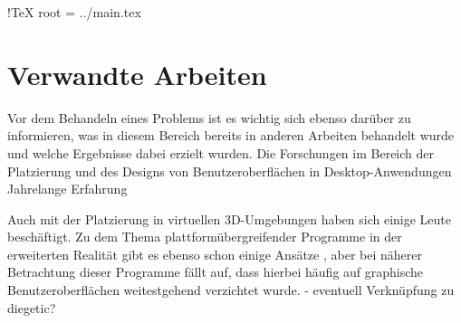  !TeX root = ../main.tex

\chapter{Verwandte Arbeiten}\label{chapter:background}
	

	
		
		
		
		
		
	Vor dem Behandeln eines Problems ist es wichtig sich ebenso darüber zu informieren, was in diesem Bereich bereits in anderen Arbeiten behandelt wurde und welche Ergebnisse dabei erzielt wurden.
	Die Forschungen im Bereich der Platzierung und des Designs von Benutzeroberflächen in Desktop-Anwendungen  Jahrelange Erfahrung
	
	
	Auch mit der Platzierung in virtuellen 3D-Umgebungen haben sich einige Leute beschäftigt. 
	Zu dem Thema plattformübergreifender Programme in der erweiterten Realität gibt es ebenso schon einige Ansätze , aber bei näherer Betrachtung dieser Programme fällt auf, dass hierbei häufig auf graphische Benutzeroberflächen weitestgehend verzichtet wurde. 
	- eventuell Verknüpfung zu diegetic?
		
